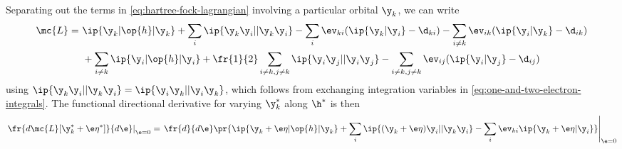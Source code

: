 Separating out the terms in \cref{eq:hartree-fock-lagrangian} involving a particular orbital $\y_k$, we can write
\begin{align*}
  \mc{L}
=&\
  \ip{\y_k|\op{h}|\y_k}
+
  \sum_i
  \ip{\y_k\y_i||\y_k\y_i}
-
  \sum_i
  \ev_{ki}(\ip{\y_k|\y_i}-\d_{ki})
-
  \sum_{i\neq k}
  \ev_{ik}(\ip{\y_i|\y_k}-\d_{ik})
\\&\
+
  \sum_{i\neq k}
  \ip{\y_i|\op{h}|\y_i}
+
  \fr{1}{2}
  \sum_{i\neq k,j\neq k}
  \ip{\y_i\y_j||\y_i\y_j}
-
  \sum_{i\neq k,j\neq k}
  \ev_{ij}(\ip{\y_i|\y_j}-\d_{ij})
\end{align*}
using $\ip{\y_k\y_i||\y_k\y_i}=\ip{\y_i\y_k||\y_i\y_k}$, which follows from exchanging integration variables in \cref{eq:one-and-two-electron-integrals}.
The functional directional derivative for varying $\y_k^*$ along $\h^*$ is then
\begin{align*}
\left.
  \fr{d\mc{L}[\y_k^*+\e \eta^*]}{d\e}
\right|_{\e=0}
=
\left.
\fr{d}{d\e}
\pr{
  \ip{\y_k+\e\eta|\op{h}|\y_k}
+
  \sum_i
  \ip{(\y_k+\e\eta)\y_i||\y_k\y_i}
-
  \sum_i
  \ev_{ki}\ip{\y_k+\e\eta|\y_i}
}
\right|_{\e=0}
\end{align*}

